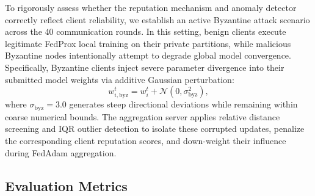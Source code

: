 \documentclass[conference, a4paper]{IEEEtran}
\begin{document}
To rigorously assess whether the reputation mechanism and anomaly detector correctly reflect client reliability, we establish an active Byzantine attack scenario across the 40 communication rounds. In this setting, benign clients execute legitimate FedProx local training on their private partitions, while malicious Byzantine nodes intentionally attempt to degrade global model convergence. Specifically, Byzantine clients inject severe parameter divergence into their submitted model weights via additive Gaussian perturbation:
\begin{equation}
w_{i,\mathrm{byz}}^t = w_i^t + \mathcal{N}(0, \sigma_{\mathrm{byz}}^2),
\label{eq:byz_attack}
\end{equation}
where $\sigma_{\mathrm{byz}} = 3.0$ generates steep directional deviations while remaining within coarse numerical bounds. The aggregation server applies relative distance screening and IQR outlier detection to isolate these corrupted updates, penalize the corresponding client reputation scores, and down-weight their influence during FedAdam aggregation.

\subsection{Evaluation Metrics}

\begin{table}[H]
\centering
\caption{Evaluation Metrics and Descriptions}
\label{tab:eval_metrics}
\renewcommand{\arraystretch}{1.5}
\end{table}
\end{document}
